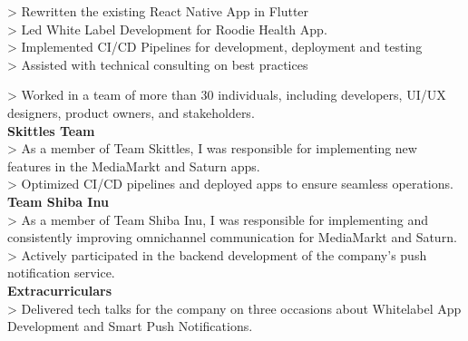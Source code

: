 \documentclass[10pt,a4paper,normalphoto]{altacv}
\begin{document}
\newpage
\begin{fullwidth}
    

> Rewritten the existing React Native App in Flutter\\
> Led White Label Development for Roodie Health App.\\
> Implemented CI/CD Pipelines for development, deployment and testing\\
> Assisted with technical consulting on best practices\\

\vspace{1em}


\vspace{2em}
    
> Worked in a team of more than 30 individuals, including developers, UI/UX designers, product owners, and stakeholders.\\
\vspace{.5em}
\textbf{Skittles Team}\\
> As a member of Team Skittles, I was responsible for implementing new features in the MediaMarkt and Saturn apps.\\
> Optimized CI/CD pipelines and deployed apps to ensure seamless operations.\\
\vspace{.5em}
\textbf{Team Shiba Inu}\\
> As a member of Team Shiba Inu, I was responsible for implementing and consistently improving omnichannel communication for MediaMarkt and Saturn.\\
> Actively participated in the backend development of the company's push notification service.\\
\vspace{.5em}
\textbf{Extracurriculars}\\
> Delivered tech talks for the company on three occasions about Whitelabel App Development and Smart Push Notifications.


\end{fullwidth}
\end{document}
